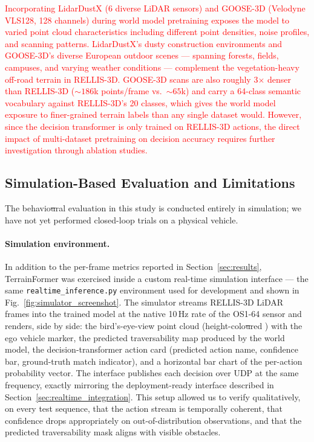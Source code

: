 \documentclass[sensors,article,submit,pdftex,moreauthors]{Definitions/mdpi}
\makeatletter
\providecommand{\DIFdel}[1]{{\protect\color{red}\sout{#1}}} %
\providecommand{\DIFdelbegin}{} %
\providecommand{\DIFdelend}{} %
\providecommand{\DIFscaledelfig}{0.5}
\newlength{\DIFdelgraphicswidth} %
\newlength{\DIFdelgraphicsheight} %
\providecommand{\DIFdelincludegraphics}[2][]{%
\sbox{\DIFdelgraphicsbox}{\DIFOincludegraphics[#1]{#2}}%
\settoboxwidth{\DIFdelgraphicswidth}{\DIFdelgraphicsbox} %
\settoboxtotalheight{\DIFdelgraphicsheight}{\DIFdelgraphicsbox} %
\scalebox{\DIFscaledelfig}{%
\parbox[b]{\DIFdelgraphicswidth}{\usebox{\DIFdelgraphicsbox}\\[-\baselineskip] \rule{\DIFdelgraphicswidth}{0em}}\llap{\resizebox{\DIFdelgraphicswidth}{\DIFdelgraphicsheight}{%
\setlength{\unitlength}{\DIFdelgraphicswidth}%
\begin{picture}(1,1)%
\thicklines\linethickness{2pt} %
{\color[rgb]{1,0,0}\put(0,0){\framebox(1,1){}}}%
{\color[rgb]{1,0,0}\put(0,0){\line( 1,1){1}}}%
{\color[rgb]{1,0,0}\put(0,1){\line(1,-1){1}}}%
\end{picture}%
}\hspace*{3pt}}} %
} %
\DeclareRobustCommand{\DIFdelbegin}{\DIFOdelbegin \let\includegraphics\DIFdelincludegraphics} %
\DeclareRobustCommand{\DIFdelend}{\DIFOaddend \let\includegraphics\DIFOincludegraphics} %
\let\sout@orig\sout %
\renewcommand{\sout}[1]{\ifmmode\text{\sout@orig{\ensuremath{#1}}}\else\sout@orig{#1}\fi} %
\makeatother
\begin{document}
\textcolor{red}{Incorporating LidarDustX (6 diverse LiDAR sensors) and GOOSE-3D (Velodyne VLS128, 128 channels) during world model pretraining exposes the model to varied point cloud characteristics including different point densities, noise profiles, and scanning patterns. LidarDustX's dusty construction environments and GOOSE-3D's diverse European outdoor scenes --- spanning forests, fields, campuses, and varying weather conditions --- complement the vegetation-heavy off-road terrain in RELLIS-3D. GOOSE-3D scans are also roughly 3$\times$ denser than RELLIS-3D (${\sim}186$k points/frame vs.\ ${\sim}65$k) and carry a 64-class semantic vocabulary against RELLIS-3D's 20 classes, which gives the world model exposure to finer-grained terrain labels than any single dataset would. However, since the decision transformer is only trained on RELLIS-3D actions, the direct impact of multi-dataset pretraining on decision accuracy requires further investigation through ablation studies.}

\subsection{Simulation-Based Evaluation and Limitations}
\label{sec:limitations}

The behavio\DIFdelbegin \DIFdel{u}\DIFdelend ral evaluation in this study is conducted entirely in simulation; we have not yet performed closed-loop trials on a physical vehicle.

\paragraph{Simulation environment.}
In addition to the per-frame metrics reported in Section~\ref{sec:results}, TerrainFormer was exercised inside a custom real-time simulation interface --- the same \texttt{realtime\_inference.py} environment used for development and shown in Fig.~\ref{fig:simulator_screenshot}. The simulator streams RELLIS-3D LiDAR frames into the trained model at the native 10\,Hz rate of the OS1-64 sensor and renders, side by side: the bird's-eye-view point cloud (height-colo\DIFdelbegin \DIFdel{u}\DIFdelend red ) with the ego vehicle marker, the predicted traversability map produced by the world model, the decision-transformer action card (predicted action name, confidence bar, ground-truth match indicator), and a horizontal bar chart of the per-action probability vector. The interface publishes each decision over UDP at the same frequency, exactly mirroring the deployment-ready interface described in Section~\ref{sec:realtime_integration}. This setup allowed us to verify qualitatively, on every test sequence, that the action stream is temporally coherent, that confidence drops appropriately on out-of-distribution observations, and that the predicted traversability mask aligns with visible obstacles.
\end{document}
